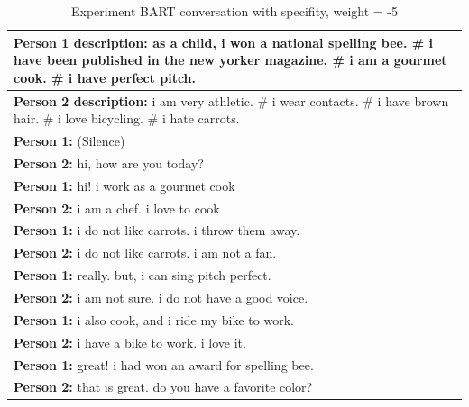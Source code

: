 \begin{table}[ht]
\centering
 \begin{tabular}{|p{14cm}|} 
 \hline\hline
 \textbf{Person 1 description:} as a child, i won a national spelling bee. \# i have been published in the new yorker magazine. \# i am a gourmet cook. \# i have perfect pitch. \\
 \hline
 \textbf{Person 2 description:} i am very athletic. \# i wear contacts. \# i have brown hair. \# i love bicycling. \# i hate carrots. \\
 \hline\hline
 \textbf{Person 1:} (Silence) \\
 \textbf{Person 2:} hi, how are you today? \\ 
 \textbf{Person 1:} hi! i work as a gourmet cook \\
 \textbf{Person 2:} i am a chef. i love to cook \\
 \textbf{Person 1:} i do not like carrots. i throw them away. \\
 \textbf{Person 2:} i do not like carrots. i am not a fan. \\
 \textbf{Person 1:} really. but, i can sing pitch perfect. \\
 \textbf{Person 2:} i am not sure. i do not have a good voice. \\
 \textbf{Person 1:} i also cook, and i ride my bike to work. \\
 \textbf{Person 2:} i have a bike to work. i love it. \\
 \textbf{Person 1:} great! i had won an award for spelling bee. \\
 \textbf{Person 2:} that is great. do you have a favorite color? \\
 \hline\hline
 \end{tabular}
 \caption{Experiment BART conversation with specifity, weight = -5}
\label{tab:bart_conversation_idf5}
\end{table}

